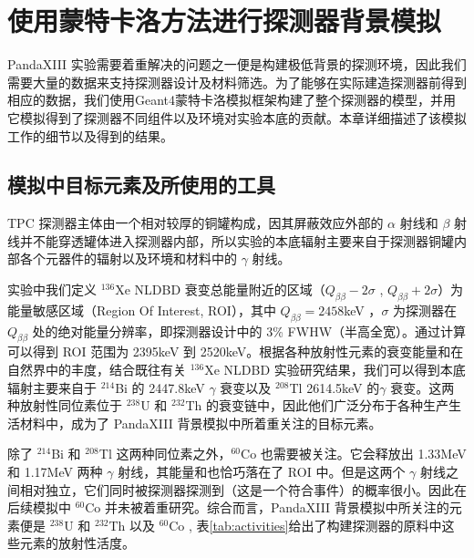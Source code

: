 \chapter{使用蒙特卡洛方法进行探测器背景模拟}
\label{chapter:background}

PandaXIII 实验需要着重解决的问题之一便是构建极低背景的探测环境，因此我们需要大量的数据来支持探测器设计及材料筛选。为了能够在实际建造探测器前得到相应的数据，我们使用Geant4\supercite{Agostinelli:2002hh}蒙特卡洛模拟框架构建了整个探测器的模型，并用它模拟得到了探测器不同组件以及环境对实验本底的贡献。本章详细描述了该模拟工作的细节以及得到的结果。

\section{模拟中目标元素及所使用的工具}

 TPC 探测器主体由一个相对较厚的铜罐构成，因其屏蔽效应外部的 $\alpha$ 射线和 $\beta$ 射线并不能穿透罐体进入探测器内部，所以实验的本底辐射主要来自于探测器铜罐内部各个元器件的辐射以及环境和材料中的 $\gamma$ 射线。

实验中我们定义 $^{136}$Xe NLDBD 衰变总能量附近的区域（$Q_{\beta\beta}-2\sigma$ , $Q_{\beta\beta}+2\sigma$）为能量敏感区域（Region Of Interest, ROI），其中 $Q_{\beta\beta}=2458$keV ，$\sigma$ 为探测器在 $Q_{\beta\beta}$ 处的绝对能量分辨率，即探测器设计中的 3\% FWHW（半高全宽）。通过计算可以得到 ROI 范围为 2395keV 到 2520keV。根据各种放射性元素的衰变能量和在自然界中的丰度，结合既往有关 $^{136}$Xe NLDBD 实验研究结果，我们可以得到本底辐射主要来自于 $^{214}$Bi 的 2447.8keV $\gamma$ 衰变以及 $^{208}$Tl  2614.5keV 的$\gamma$ 衰变。这两种放射性同位素位于 $^{238}$U 和 $^{232}$Th 的衰变链中，因此他们广泛分布于各种生产生活材料中，成为了 PandaXIII 背景模拟中所着重关注的目标元素。

除了 $^{214}$Bi 和 $^{208}$Tl 这两种同位素之外，$^{60}$Co 也需要被关注。它会释放出 1.33MeV 和 1.17MeV 两种 $\gamma$ 射线，其能量和也恰巧落在了 ROI 中。但是这两个 $\gamma$ 射线之间相对独立，它们同时被探测器探测到（这是一个符合事件）的概率很小。因此在后续模拟中 $^{60}$Co 并未被着重研究。综合而言，PandaXIII 背景模拟中所关注的元素便是 $^{238}$U 和 $^{232}$Th 以及 $^{60}$Co  , 表\ref{tab:activities}给出了构建探测器的原料中这些元素的放射性活度。

